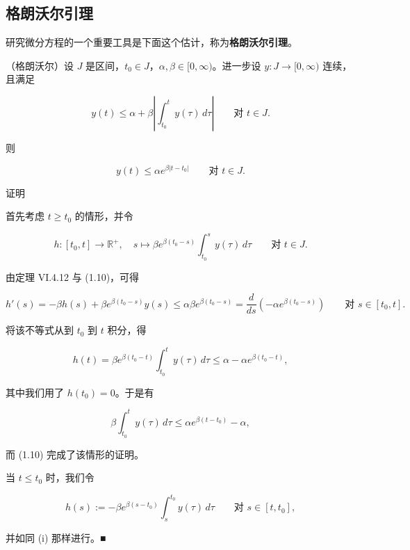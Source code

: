 \subsection*{格朗沃尔引理}

研究微分方程的一个重要工具是下面这个估计，称为\textbf{格朗沃尔引理}。

\begin{lemma}

（格朗沃尔）设 $ J $ 是区间，$ t_{0} \in J $，$ \alpha, \beta \in [0, \infty) $。进一步设 $ y : J \to [0, \infty) $ 连续，且满足

\begin{equation}
y(t) \le \alpha + \beta\left| \int_{t_{0}}^{t} y(\tau)\,d\tau \right| \qquad \text{对 } t \in J .\tag{1.10}
\end{equation}

则

\[
y(t) \le \alpha e^{\beta|t - t_{0}|} \qquad \text{对 } t \in J .
\]

证明

\begin{subitems}
\item

首先考虑 $ t \ge t_{0} $ 的情形，并令

\[
h : [t_{0}, t] \to \mathbb{R}^{+} , \quad s \mapsto \beta e^{\beta(t_{0} - s)}\int_{t_{0}}^{s} y(\tau)\,d\tau \qquad \text{对 } t \in J .
\]

由定理 VI.4.12 与 (1.10)，可得

\[
h'(s) = -\beta h(s) + \beta e^{\beta(t_{0} - s)}y(s) \le \alpha\beta e^{\beta(t_{0} - s)} = \frac{d}{ds}\left( -\alpha e^{\beta(t_{0} - s)} \right) \qquad \text{对 } s \in [t_{0}, t] .
\]

将该不等式从到 $ t_{0} $ 到 $ t $ 积分，得

\[
h(t) = \beta e^{\beta(t_{0} - t)}\int_{t_{0}}^{t} y(\tau)\,d\tau \le \alpha - \alpha e^{\beta(t_{0} - t)} ,
\]

其中我们用了 $ h(t_{0}) = 0 $。于是有

\[
\beta\int_{t_{0}}^{t} y(\tau)\,d\tau \le \alpha e^{\beta(t - t_{0})} - \alpha ,
\]

而 (1.10) 完成了该情形的证明。

\item

当 $ t \le t_{0} $ 时，我们令

\[
h(s) := -\beta e^{\beta(s - t_{0})}\int_{s}^{t_{0}} y(\tau)\,d\tau \qquad \text{对 } s \in [t, t_{0}] ,
\]

并如同 (i) 那样进行。\nobreak\hspace{0.35em}■

\end{subitems}

\end{lemma}


